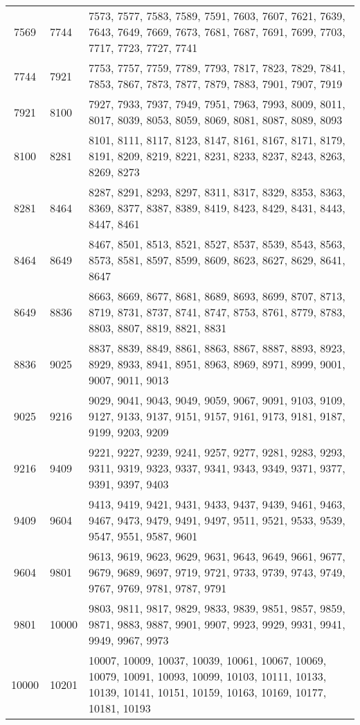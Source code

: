 \documentclass[12pt]{article}
\begin{document}
\begin{tabular}{|c|l|l|}
7569 & 7744 & 7573, 7577, 7583, 7589, 7591, 7603, 7607, 7621, 7639, 7643, 7649, 7669, 7673, 7681, 7687, 7691, 7699, 7703, 7717, 7723, 7727, 7741 \\
7744 & 7921 & 7753, 7757, 7759, 7789, 7793, 7817, 7823, 7829, 7841, 7853, 7867, 7873, 7877, 7879, 7883, 7901, 7907, 7919 \\
7921 & 8100 & 7927, 7933, 7937, 7949, 7951, 7963, 7993, 8009, 8011, 8017, 8039, 8053, 8059, 8069, 8081, 8087, 8089, 8093 \\
8100 & 8281 & 8101, 8111, 8117, 8123, 8147, 8161, 8167, 8171, 8179, 8191, 8209, 8219, 8221, 8231, 8233, 8237, 8243, 8263, 8269, 8273 \\
8281 & 8464 & 8287, 8291, 8293, 8297, 8311, 8317, 8329, 8353, 8363, 8369, 8377, 8387, 8389, 8419, 8423, 8429, 8431, 8443, 8447, 8461 \\
8464 & 8649 & 8467, 8501, 8513, 8521, 8527, 8537, 8539, 8543, 8563, 8573, 8581, 8597, 8599, 8609, 8623, 8627, 8629, 8641, 8647 \\
8649 & 8836 & 8663, 8669, 8677, 8681, 8689, 8693, 8699, 8707, 8713, 8719, 8731, 8737, 8741, 8747, 8753, 8761, 8779, 8783, 8803, 8807, 8819, 8821, 8831 \\
8836 & 9025 & 8837, 8839, 8849, 8861, 8863, 8867, 8887, 8893, 8923, 8929, 8933, 8941, 8951, 8963, 8969, 8971, 8999, 9001, 9007, 9011, 9013 \\
9025 & 9216 & 9029, 9041, 9043, 9049, 9059, 9067, 9091, 9103, 9109, 9127, 9133, 9137, 9151, 9157, 9161, 9173, 9181, 9187, 9199, 9203, 9209 \\
9216 & 9409 & 9221, 9227, 9239, 9241, 9257, 9277, 9281, 9283, 9293, 9311, 9319, 9323, 9337, 9341, 9343, 9349, 9371, 9377, 9391, 9397, 9403 \\
9409 & 9604 & 9413, 9419, 9421, 9431, 9433, 9437, 9439, 9461, 9463, 9467, 9473, 9479, 9491, 9497, 9511, 9521, 9533, 9539, 9547, 9551, 9587, 9601 \\
9604 & 9801 & 9613, 9619, 9623, 9629, 9631, 9643, 9649, 9661, 9677, 9679, 9689, 9697, 9719, 9721, 9733, 9739, 9743, 9749, 9767, 9769, 9781, 9787, 9791 \\
9801 & 10000 & 9803, 9811, 9817, 9829, 9833, 9839, 9851, 9857, 9859, 9871, 9883, 9887, 9901, 9907, 9923, 9929, 9931, 9941, 9949, 9967, 9973 \\
10000 & 10201 & 10007, 10009, 10037, 10039, 10061, 10067, 10069, 10079, 10091, 10093, 10099, 10103, 10111, 10133, 10139, 10141, 10151, 10159, 10163, 10169, 10177, 10181, 10193 \\
\end{tabular}

\end{document}
